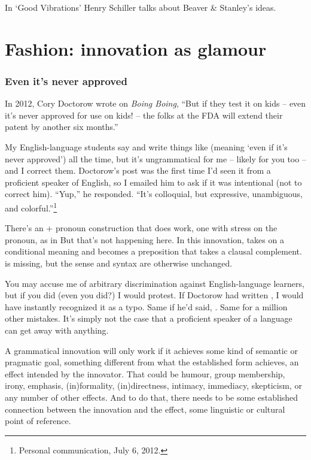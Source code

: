 In `Good Vibrations' Henry Schiller talks about Beaver \& Stanley's ideas.

\section{Fashion: innovation as glamour}



\subsubsection{Even it's never approved}

In 2012, Cory Doctorow wrote on \textit{Boing Boing}, ``But if they test it on kids -- even it's never approved for use on kids! -- the folks at the FDA will extend their patent by another six months.''

My English-language students say and write things like  (meaning `even if it's never approved') all the time, but it's ungrammatical for me -- likely for you too -- and I correct them. Doctorow's post was the first time I'd seen it from a proficient speaker of English, so I emailed him to ask if it was intentional (not to correct him). ``Yup,'' he responded. ``It's colloquial, but expressive, unambiguous, and colorful.''\footnote{Personal communication, July 6, 2012.}

There's an  + pronoun construction that does work, one with stress on the pronoun, as in  But that's not happening here. In this innovation,  takes on a conditional meaning and becomes a preposition that takes a clausal complement.  is missing, but the sense and syntax are otherwise unchanged.

You may accuse me of arbitrary discrimination against English-language learners, but if you did (even you did?) I would protest. If Doctorow had written , I would have instantly recognized it as a typo. Same if he'd said, . Same for a million other mistakes. It's simply not the case that a proficient speaker of a language can get away with anything.

A grammatical innovation will only work if it achieves some kind of semantic or pragmatic goal, something different from what the established form achieves, an effect intended by the innovator. That could be humour, group membership, irony, emphasis, (in)formality, (in)directness, intimacy, immediacy, skepticism, or any number of other effects. And to do that, there needs to be some established connection between the innovation and the effect, some linguistic or cultural point of reference.

